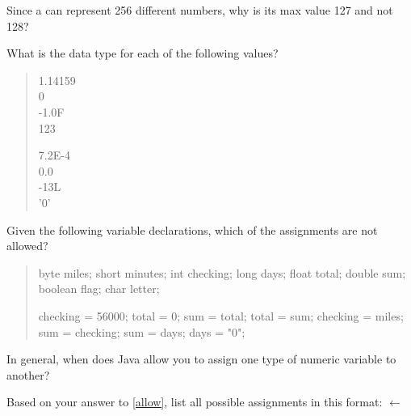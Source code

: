 \Q Since a  can represent 256 different numbers, why is its max value 127 and not 128?

\begin{answer}
\end{answer}


\Q What is the data type for each of the following values?

\begin{quote}
\begin{minipage}{0.5\linewidth}
1.14159  \\[1ex]
0        \\[1ex]
-1.0F    \\[1ex]
123     
\end{minipage}
\begin{minipage}{0.5\linewidth}
7.2E-4   \\[1ex]
0.0      \\[1ex]
-13L     \\[1ex]
'0'     
\end{minipage}
\end{quote}


\Q Given the following variable declarations, which of the assignments are not allowed?

\begin{quote}
\begin{minipage}{0.5\linewidth}

\begin{javalst}
byte miles;
short minutes;
int checking;
long days;
float total;
double sum;
boolean flag;
char letter;
\end{javalst}

\end{minipage}
\begin{minipage}{0.5\linewidth}

\begin{javalst}
checking = 56000;
total = 0;
sum = total;
total = sum;
checking = miles;
sum = checking;
sum = days;
days = "0";
\end{javalst}

\end{minipage}
\end{quote}


\Q \label{allow} In general, when does Java allow you to assign one type of numeric variable to another?

\begin{answer}
\end{answer}


\Q Based on your answer to \ref{allow}, list all possible assignments in this format:
 $\gets$ 

\begin{answer}
\end{answer}
